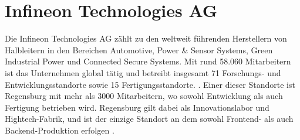 \section{Infineon Technologies AG}

Die Infineon Technologies AG zählt zu den weltweit führenden Herstellern von Halbleitern in den Bereichen Automotive, Power \& Sensor Systems, Green Industrial Power und Connected Secure Systems. Mit rund 58.060 Mitarbeitern ist das Unternehmen global tätig und betreibt insgesamt 71 Forschungs- und Entwicklungsstandorte sowie 15 Fertigungsstandorte. \cite{infineon2024unternehmenspraesentation}. Einer dieser Standorte ist Regensburg mit mehr als 3000 Mitarbeitern, wo sowohl Entwicklung als auch Fertigung betrieben wird. Regensburg gilt dabei als Innovationslabor und Hightech-Fabrik, und ist der einzige Standort an dem sowohl Frontend- als auch Backend-Produktion erfolgen \cite{infineon2024regensburg}.
